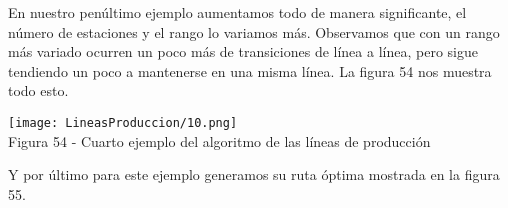 \documentclass[12pt,twoside]{article}
\begin{document}
En nuestro penúltimo ejemplo aumentamos todo de manera significante, el número de estaciones y el rango lo variamos más. Observamos que con un rango más variado ocurren un poco más de transiciones de línea a línea, pero sigue tendiendo un poco a mantenerse en una misma línea. La figura 54 nos muestra todo esto.
\begin{center}
    \texttt{[image: LineasProduccion/10.png]}\\
    Figura 54 - Cuarto ejemplo del algoritmo de las líneas de producción
\end{center}
Y por último para este ejemplo generamos su ruta óptima mostrada en la figura 55.
\begin{center}



\begin{tikzpicture}[x=0.75pt,y=0.75pt,yscale=-1,xscale=1]


\end{tikzpicture}
\end{center}
\end{document}
